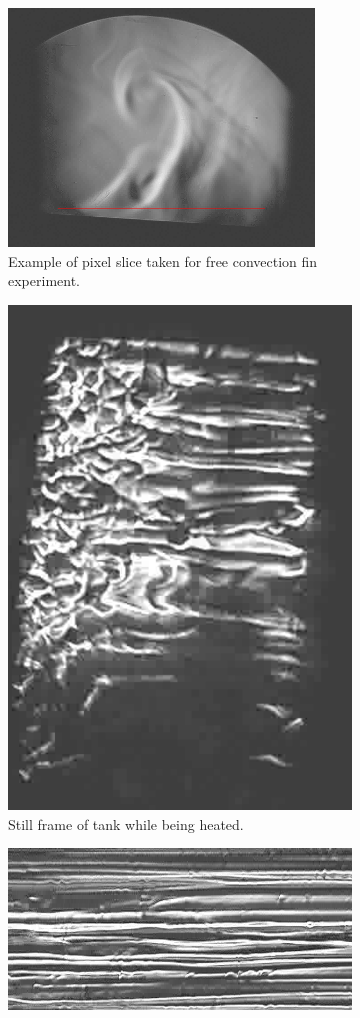 \documentclass[aip, cp, amsmath, amssymb, reprint, nofootinbib]{revtex4-2}
\begin{document}
        \begin{figure}[H]
            \centering
            \begin{subfigure}{0.33\linewidth}
                \includegraphics[width=0.5\linewidth]{figures/Pixel Slice Real.png}
                \caption{Example of pixel slice taken for free convection fin experiment.}
                \label{fig:slice-real}
            \end{subfigure}
            \begin{subfigure}[b]{0.33\linewidth}
                \centering
                \includegraphics[width=0.47\linewidth, angle=-90]{figures/LAMINAR_RAW.png}
                \caption{Still frame of tank while being heated.}
                \label{fig:laminar1}
            \end{subfigure}
            \begin{subfigure}[b]{0.33\linewidth}
                \centering
                \includegraphics[width=\linewidth]{figures/DATA.LAMINAR.png}

\end{subfigure}
\end{figure}
\end{document}
